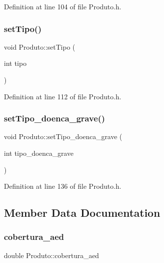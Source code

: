Definition at line 104 of file Produto.\+h.

\hypertarget{class_produto_a504d2bf1f04d4174a3f9ce7bd2290e3b}{}\label{class_produto_a504d2bf1f04d4174a3f9ce7bd2290e3b} 
\subsubsection{\texorpdfstring{set\+Tipo()}{setTipo()}}
{\footnotesize\ttfamily void Produto\+::set\+Tipo (\begin{DoxyParamCaption}\item[{int}]{tipo }\end{DoxyParamCaption})\hspace{0.3cm}{\ttfamily [inline]}}



Definition at line 112 of file Produto.\+h.

\hypertarget{class_produto_a0cd741b44502e595618500d4059f8b0e}{}\label{class_produto_a0cd741b44502e595618500d4059f8b0e} 
\subsubsection{\texorpdfstring{set\+Tipo\+\_\+doenca\+\_\+grave()}{setTipo\_doenca\_grave()}}
{\footnotesize\ttfamily void Produto\+::set\+Tipo\+\_\+doenca\+\_\+grave (\begin{DoxyParamCaption}\item[{int}]{tipo\+\_\+doenca\+\_\+grave }\end{DoxyParamCaption})\hspace{0.3cm}{\ttfamily [inline]}}



Definition at line 136 of file Produto.\+h.



\subsection{Member Data Documentation}
\hypertarget{class_produto_ae013ae980573787067774ec14ec21459}{}\label{class_produto_ae013ae980573787067774ec14ec21459} 
\subsubsection{\texorpdfstring{cobertura\+\_\+aed}{cobertura\_aed}}
{\footnotesize\ttfamily double Produto\+::cobertura\+\_\+aed\hspace{0.3cm}{\ttfamily [private]}}

